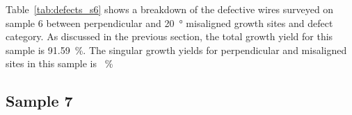 Table~\ref{tab:defects_s6} shows a breakdown of the defective wires surveyed on sample 6 between perpendicular and \qty{20}{\degree} misaligned growth sites and defect category. As discussed in the previous section, the total growth yield for this sample is \qty{91.59}{\percent}. The singular growth yields for perpendicular and misaligned sites in this sample is \qty{}{\percent}















\subsection{Sample 7}

